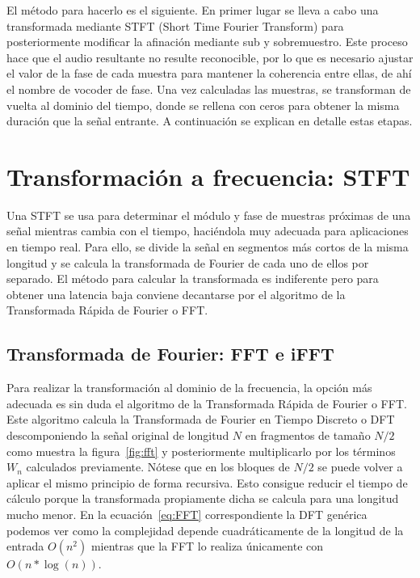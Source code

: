 El método para hacerlo es el siguiente. En primer lugar se lleva a cabo una transformada mediante STFT (Short Time Fourier Transform) para posteriormente modificar la afinación mediante sub y sobremuestro. Este proceso hace que el audio resultante no resulte reconocible, por lo que es necesario ajustar el valor de la fase de cada muestra para mantener la coherencia entre ellas, de ahí el nombre de vocoder de fase. Una vez calculadas las muestras, se transforman de vuelta al dominio del tiempo, donde se rellena con ceros para obtener la misma duración que la señal entrante. A continuación se explican en detalle estas etapas.

\section{Transformación a frecuencia: STFT}

Una STFT se usa para determinar el módulo y fase de muestras próximas de una señal mientras cambia con el tiempo, haciéndola muy adecuada para aplicaciones en tiempo real. Para ello, se divide la señal en segmentos más cortos de la misma longitud y se calcula la transformada de Fourier de cada uno de ellos por separado. El método para calcular la transformada es indiferente pero para obtener una latencia baja conviene decantarse por el algoritmo de la Transformada Rápida de Fourier o FFT.

\subsection{Transformada de Fourier: FFT e iFFT}

Para realizar la transformación al dominio de la frecuencia, la opción más adecuada es sin duda el algoritmo de la Transformada Rápida de Fourier o FFT. Este algoritmo calcula la Transformada de Fourier en Tiempo Discreto o DFT descomponiendo la señal original de longitud $N$ en fragmentos de tamaño $N/2$ como muestra la figura~\ref{fig:fft} y posteriormente multiplicarlo por los términos $W_{n}$ calculados previamente. Nótese que en los bloques de $N/2$ se puede volver a aplicar el mismo principio de forma recursiva. Esto consigue reducir el tiempo de cálculo porque la transformada propiamente dicha se calcula para una longitud mucho menor. En la ecuación~\ref{eq:FFT} correspondiente la DFT genérica podemos ver como la complejidad depende cuadráticamente de la longitud de la entrada $O({n^{2}})$ mientras que la FFT lo realiza únicamente con $O({n*\log (n)})$.

